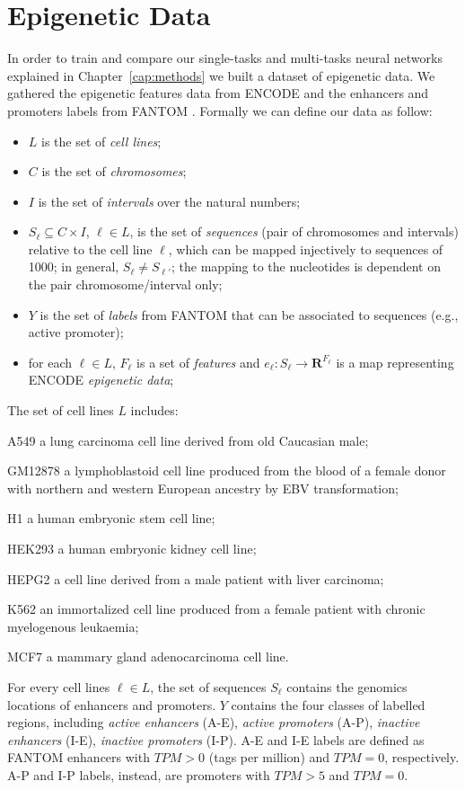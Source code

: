 \section{Epigenetic Data} \label{sec:epigenomic_data}
In order to train and compare our single-tasks and multi-tasks neural networks explained in Chapter~\ref{cap:methods} we built a dataset of epigenetic data. We gathered the epigenetic features data from
ENCODE \cite{ENCODE_data} and the enhancers and promoters labels from
FANTOM \cite{FANTOM_data}. Formally we can define our data as follow: 
\begin{itemize}
    \item $L$ is the set of \emph{cell lines};
    \item $C$ is the set of \emph{chromosomes};
    \item $I$ is the set of \emph{intervals} over the natural numbers;
    \item $S_\ell\subseteq C\times I$, $\ell\in L$, is the set of \emph{sequences} (pair of chromosomes and intervals) relative to the cell line $\ell$, which can be mapped injectively to sequences of 1000; in general, $S_\ell\neq S_{\ell'}$; the mapping to the nucleotides is dependent on the pair chromosome/interval only;
    \item $Y$ is the set of \emph{labels} from FANTOM that can be associated to sequences (e.g., active promoter);
    \item for each $\ell\in L$, $F_\ell$ is a set of \emph{features} and $e_\ell:S_\ell\to\mathbf R^{F_\ell}$ is a map representing ENCODE \emph{epigenetic data};
\end{itemize}
The set of cell lines $L$ includes: 
\begin{description} 
\item A549 a lung carcinoma cell line derived from old Caucasian male;
\item GM12878 a lymphoblastoid cell line produced from the blood of a female donor with northern and western European ancestry by EBV transformation;
\item H1 a human embryonic stem cell line; 
\item HEK293 a human embryonic kidney cell line;
\item HEPG2 a cell line derived from a male patient with liver carcinoma;
\item K562 an immortalized cell line produced from a female patient with chronic myelogenous leukaemia;
\item MCF7 a mammary gland adenocarcinoma cell line.
\end{description}
For every cell lines $\ell \in L$, the set of sequences $S_\ell$ contains the genomics locations of enhancers and promoters. $Y$ contains the four classes of labelled regions, including \emph{active enhancers} (A-E), \emph{active promoters} (A-P), \emph{inactive enhancers} (I-E), \emph{inactive promoters} (I-P). A-E and I-E labels are defined as FANTOM enhancers with $TPM>0$ (tags per million) and $TPM=0$, respectively. A-P and I-P labels, instead, are promoters with $TPM>5$ and $TPM=0$. 

